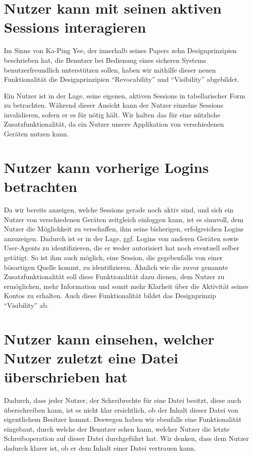 \documentclass[12pt,DIV14,BCOR10mm,a4paper,parskip=half-,headsepline,headinclude,english,ngerman,bibliography=totocnumbered]{scrreprt}
\begin{document}
\section{Nutzer kann mit seinen aktiven Sessions interagieren}

Im Sinne von Ka-Ping Yee, der innerhalb seines Papers  \autocite{Yee.UserInteraction} zehn Designprinzipien beschrieben hat, die Benutzer bei Bedienung eines sicheren Systems benutzerfreundlich unterstützen sollen, haben wir mithilfe dieser neuen Funktionalität die Designprinzipien \enquote{Revocability} und \enquote{Visibility} abgebildet. \par
Ein Nutzer ist in der Lage, seine eigenen, aktiven Sessions in tabellarischer Form zu betrachten.
Während dieser Ansicht kann der Nutzer einzelne Sessions invalidieren, sofern er es für nötig hält.
Wir halten das für eine nützliche Zusatzfunktionalität, da ein Nutzer unsere Applikation von verschiedenen Geräten nutzen kann.

\section{Nutzer kann vorherige Logins betrachten}

Da wir bereits anzeigen, welche Sessions gerade noch aktiv sind, und sich ein Nutzer von verschiedenen Geräten zeitgleich einloggen kann, ist es sinnvoll, dem Nutzer die Möglichkeit zu verschaffen, ihm seine bisherigen, erfolgreichen Logins anzuzeigen.
Dadurch ist er in der Lage, ggf. Logins von anderen Geräten sowie User-Agents zu identifizieren, die er weder autorisiert hat noch eventuell selber getätigt.
So ist ihm auch möglich, eine Session, die gegebenfalls von einer bösartigen Quelle kommt, zu identifizieren.
Ähnlich wie die zuvor genannte Zusatzfunktionalität soll diese Funktionalität dazu dienen, dem Nutzer zu ermöglichen, mehr Information und somit mehr Klarheit über die Aktivität seines Kontos zu erhalten.
Auch diese Funktionalität bildet das Designprinzip \enquote{Visibility} ab.

\section{Nutzer kann einsehen, welcher Nutzer zuletzt eine Datei überschrieben hat}

Dadurch, dass jeder Nutzer, der Schreibrechte für eine Datei besitzt, diese auch überschreiben kann, ist es nicht klar ersichtlich, ob der Inhalt dieser Datei von eigentlichem Besitzer kommt.
Deswegen haben wir ebenfalls eine Funktionalität eingebaut, durch welche der Benutzer sehen kann, welcher Nutzer die letzte Schreiboperation auf dieser Datei durchgeführt hat.
Wir denken, dass dem Nutzer dadurch klarer ist, ob er dem Inhalt einer Datei vertrauen kann.
\end{document}
